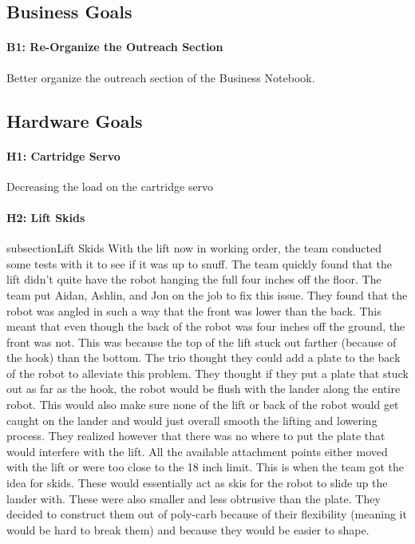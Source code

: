 \documentclass{article}
\begin{document}
\subsection{Business Goals}
\paragraph{B1: Re-Organize the Outreach Section}
 Better organize the outreach section of the Business Notebook. 
\subsection{Hardware Goals}
\paragraph{H1: Cartridge Servo}
 Decreasing the load on the cartridge servo
\paragraph{H2: Lift Skids}
subsection{Lift Skids}
With the lift now in working order, the team conducted some tests with it to see if it was up to snuff. The team quickly found that the lift didn't quite have the robot hanging the full four inches off the floor. The team put Aidan, Ashlin, and Jon on the job to fix this issue. They found that the robot was angled in such a way that the front was lower than the back. This meant that even though the back of the robot was four inches off the ground, the front was not. This was because the top of the lift stuck out farther (because of the hook) than the bottom. The trio thought they could add a plate to the back of the robot to alleviate this problem. They thought if they put a plate that stuck out as far as the hook, the robot would be flush with the lander along the entire robot. This would also make sure none of the lift or back of the robot would get caught on the lander and would just overall smooth the lifting and lowering process. They realized however that there was no where to put the plate that would interfere with the lift. All the available attachment points either moved with the lift or were too close to the 18 inch limit. This is when the team got the idea for skids. These would essentially act as skis for the robot to slide up the lander with. These were also smaller and less obtrusive than the plate. They decided to construct them out of poly-carb because of their flexibility (meaning it would be hard to break them) and because they would be easier to shape.
\newpage
\end{document}
